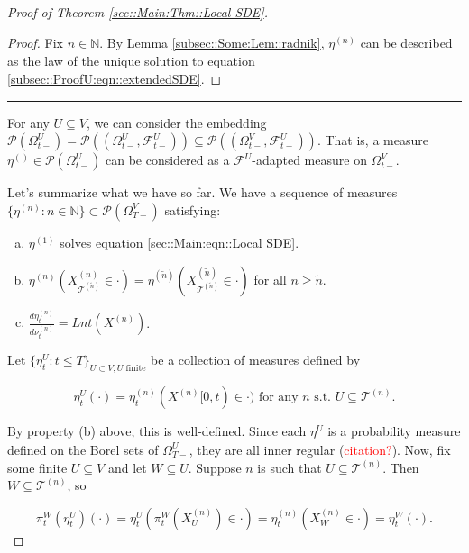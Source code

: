 \documentclass[12pt]{article}
\newcommand{\mb}{\mathbb}
\newcommand{\mc}{\mathcal}
\newcommand{\te}{\text}
\newcommand{\tr}{\textcolor{red}}
\newcommand{\ind}{\hspace{24pt}}
\newcommand{\lin}{\rule{\linewidth}{0.4 pt}}
\newcommand{\pmsr}{\mc{P}}							%
\renewcommand{\U}{U}							%
\newcommand{\UU}{W}								%
\newcommand{\T}{T}								%
\renewcommand{\t}{t}							%
\newcommand{\sset}{\Omega}						%
\newcommand{\proj}{\pi}							%
\renewcommand{\tt}{s}							%
\newcommand{\F}{\mc{F}}							%
\newcommand{\X}{X}								%
\newcommand{\vind}[1]{^{#1}}					%
\newcommand{\vsi}[1]{^{#1}}						%
\newcommand{\cind}[1]{_{#1}}					%
\newcommand{\tip}[1]{#1}						%
\newcommand{\ts}[1]{_{#1}}						%
\newcommand{\tree}{\mc{T}}						%
\newcommand{\sln}[1]{^{(#1)}}					%
\newcommand{\alt}[1]{\widetilde{#1}}			%
\newcommand{\mm}{\nu}							%
\newcommand{\mmm}{\eta}							%
\newcommand{\dense}{L}							%
\begin{document}
\begin{proof}[Proof of Theorem \ref{sec::Main:Thm::Local SDE}]
\begin{proof}
\ind Fix \(n\in\mb{N}\). By Lemma \ref{subsec::Some:Lem::radnik}, \(\mmm\sln{n}\ts{}\) can be described as the law of the unique solution to equation \eqref{subsec::ProofU:eqn::extendedSDE}.
\end{proof}

\lin

For any \(\U\subseteq V\), we can consider the embedding \(\pmsr\left(\sset\vsi{\U}\ts{\t-}\right) = \pmsr\left((\sset\vsi{\U}\ts{\t-},\F\vsi{\U}\ts{\t-})\right) \subseteq \pmsr\left((\sset\vsi{V}\ts{\t-},\F\vsi{\U}\ts{\t-})\right)\). That is, a measure \(\mmm\sln{}\ts{}\in \pmsr\left(\sset\vsi{\U}\ts{\t-}\right)\) can be considered as a \(\F\vsi{\U}\ts{}\)-adapted measure on \(\sset\vsi{V}\ts{\t-}\).

\ind Let's summarize what we have so far. We have a sequence of measures \(\{\mmm\sln{n}\ts{}:n\in\mb{N}\} \subset \pmsr(\sset\vsi{V}\ts{\T-})\) satisfying:

\begin{enumerate}[(a)]
\item \(\mmm\sln{1}\ts{}\) solves equation \eqref{sec::Main:eqn::Local SDE}.

\item \(\mmm\sln{n}\ts{}(\X\sln{n}\cind{\tree\sln{\alt{n}}}\tip{} \in \cdot) = \mmm\sln{\alt{n}}\ts{}(\X\sln{\alt{n}}\cind{\tree\sln{\alt{n}}}\tip{}\in \cdot)\) for all \(n \geq \alt{n}\).

\item \(\frac{d\mmm\sln{n}\ts{\t}}{d\mm\sln{n}\ts{\t}} = \dense{n}{\t}(\X\sln{n}\cind{}\tip{})\).
\end{enumerate}

Let \(\{\mmm\vind{\U}\ts{\t}:\t \leq \T\}_{\U\subset V,\U\te{ finite}}\) be a collection of measures defined by

\[\mmm\vind{\U}\ts{\t}(\cdot) = \mmm\sln{n}\ts{\t}(\X\sln{n}\cind{}\tip{[0,\t)} \in \cdot) \te{ for any }n\te{ \tt.\t. }\U \subseteq \tree\sln{n}.\]

By property (b) above, this is well-defined. Since each \(\mmm\vind{\U}\ts{}\) is a probability measure defined on the Borel sets of \(\sset\vsi{\U}\ts{\T-}\), they are all inner regular (\tr{citation?}). Now, fix some finite \(\U\subseteq V\) and let \(\UU \subseteq \U\). Suppose \(n\) is such that \(\U \subseteq \tree\sln{n}\). Then \(\UU\subseteq \tree\sln{n}\), so

\[\proj\vsi{\UU}\ts{\t}(\mmm\vind{\U}\ts{\t})(\cdot) = \mmm\vind{\U}\ts{\t}\left(\proj\vsi{\UU}\ts{\t}(\X\sln{n}\cind{\U}\tip{}) \in \cdot\right) = \mmm\sln{n}\ts{\t}\left(\X\sln{n}\cind{\UU}\tip{} \in \cdot\right) = \mmm\vind{\UU}\ts{\t}(\cdot).\]


\end{proof}
\end{document}

